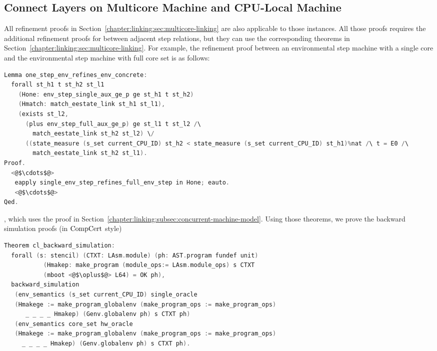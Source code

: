 
\subsection{Connect Layers on Multicore Machine and CPU-Local Machine}
\label{chapter:certikos:subsec:connect-multicore}

All refinement proofs in Section~\ref{chapter:linking:sec:multicore-linking} are also applicable 
to those instances. 
All those proofs requires the additional refinement proofs for between adjacent step relations, but they can 
use the corresponding theorems in Section~\ref{chapter:linking:sec:multicore-linking}. 
For example, the refinement proof between an environmental step machine with a single core and the environmental step machine with full core set is 
as follows:
\begin{lstlisting}[language=C]
Lemma one_step_env_refines_env_concrete:
  forall st_h1 t st_h2 st_l1
    (Hone: env_step_single_aux_ge_p ge st_h1 t st_h2)
    (Hmatch: match_eestate_link st_h1 st_l1),
    (exists st_l2,
      (plus env_step_full_aux_ge_p) ge st_l1 t st_l2 /\
        match_eestate_link st_h2 st_l2) \/
      ((state_measure (s_set current_CPU_ID) st_h2 < state_measure (s_set current_CPU_ID) st_h1)%nat /\ t = E0 /\
        match_eestate_link st_h2 st_l1).
Proof.
  <@$\cdots$@>
   eapply single_env_step_refines_full_env_step in Hone; eauto.
   <@$\cdots$@>
Qed.
\end{lstlisting}
, which uses the proof in Section~\ref{chapter:linking:subsec:concurrent-machine-model}.
Using those theorems, 
we prove the backward simulation proofs (in $\mathrm{CompCert}$ style) 
\begin{lstlisting}[language=C]
Theorem cl_backward_simulation:
  forall (s: stencil) (CTXT: LAsm.module) (ph: AST.program fundef unit)
           (Hmakep: make_program (module_ops:= LAsm.module_ops) s CTXT 
           (mboot <@$\oplus$@> L64) = OK ph),
  backward_simulation
   (env_semantics (s_set current_CPU_ID) single_oracle
   (Hmakege := make_program_globalenv (make_program_ops := make_program_ops)
      _ _ _ _ Hmakep) (Genv.globalenv ph) s CTXT ph)
   (env_semantics core_set hw_oracle
   (Hmakege := make_program_globalenv (make_program_ops := make_program_ops) 
     _ _ _ _ Hmakep) (Genv.globalenv ph) s CTXT ph).
\end{lstlisting}


